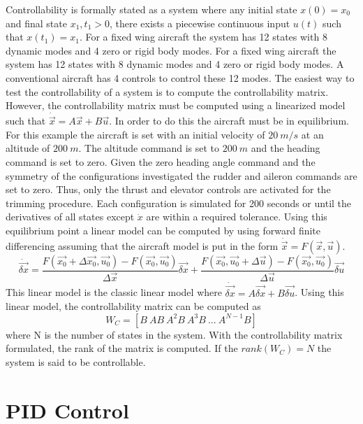 \documentclass{article}
\begin{document}
Controllability is formally stated as a system where any initial
state $x(0)=x_0$ and final state $x_1,t_1>0$, there exists a piecewise
continuous input $u(t)$ such that $x(t_1)=x_1$. 
For a fixed wing aircraft the system has 12 states with 8 dynamic
modes and 4 zero or rigid body modes. For a fixed wing aircraft the system has 12 states with 8 dynamic
modes and 4 zero or rigid body modes. A conventional aircraft has 4
controls to control these 12 modes. The easiest way to test the 
controllability of a system  is to compute the
controllability matrix. However, the controllability matrix must be
computed using a linearized model such that
$\dot{\vec{x}}=A\vec{x}+B\vec{u}$. In order to do this the aircraft
must be in equilibrium. For this example the aircraft is
set with an initial velocity of $20~m/s$ at an altitude of
$200~m$. The altitude command is set to $200~m$ and the heading
command is set to zero. Given the zero heading angle command and the
symmetry of the configurations investigated the rudder and aileron
commands are set to zero. Thus, only the thrust and elevator controls
are activated for the trimming procedure. Each configuration is
simulated for 200 seconds or until the derivatives of all states
except $\dot{x}$ are within a required tolerance. Using this
equilibrium point a linear model can be computed by using forward
finite differencing assuming that the
aircraft model is put in the form $\dot{\vec{x}} = F(\vec{x},\vec{u})$.
\begin{equation}
\dot{\vec{\delta x}} = \frac{F(\vec{x_0}+\Delta \vec{x_0},\vec{u_0})-F(\vec{x_0},\vec{u_0})}{\Delta
  \vec{x}}\vec{\delta x} + \frac{F(\vec{x_0},\vec{u_0}+\Delta
  \vec{u})-F(\vec{x_0},\vec{u_0})}{\Delta \vec{u}}\vec{\delta u}
\end{equation}
This linear model is the classic linear model where
$\dot{\vec{\delta x}}=A\vec{\delta{x}}+B\vec{\delta{u}}$. Using this linear model, the
controllability matrix can be computed as
\begin{equation}
W_C = [B~AB~A^2B~A^3B~...~A^{N-1}B]
\end{equation}
where N is the number of states in the system. With the controllability
matrix formulated, the rank of the matrix is computed. If the
$rank(W_C)=N$ the system is said to be controllable.

\section{PID Control}
\end{document}
